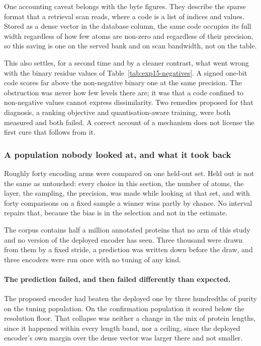 \begin{table}[htbp]
  \centering
  \caption{Maximum F-measure against the bits kept per stored value, with the bytes a
  code occupies in the sparse retrieval format. $^{*}$~the 95\,\% interval excludes
  zero.}
  \label{tab:exp15-quantisation}
  
\end{table}

One accounting caveat belongs with the byte figures. They describe the sparse format
that a retrieval scan reads, where a code is a list of indices and values. Stored as a
dense vector in the database column, the same code occupies its full width regardless
of how few atoms are non-zero and regardless of their precision, so this saving is one
on the served bank and on scan bandwidth, not on the table.

This also settles, for a second time and by a cleaner contrast, what went wrong with
the binary residue values of Table~\ref{tab:exp15-negatives}. A signed one-bit code
scores far above the non-negative binary one at the same precision. The obstruction
was never how few levels there are; it was that a code confined to non-negative
values cannot express dissimilarity. Two remedies proposed for that diagnosis, a
ranking objective and quantisation-aware training, were both measured and both failed.
A correct account of a mechanism does not license the first cure that follows from it.

\subsubsection{A population nobody looked at, and what it took back}
\label{sec:exp15-confirmation}

Roughly forty encoding arms were compared on one held-out set. Held out is not the
same as untouched: every choice in this section, the number of atoms, the layer, the
sampling, the precision, was made while looking at that set, and with forty
comparisons on a fixed sample a winner wins partly by chance. No interval repairs
that, because the bias is in the selection and not in the estimate.

The corpus contains half a million annotated proteins that no arm of this study and
no version of the deployed encoder has seen. Three thousand were drawn from them by a
fixed stride, a prediction was written down before the draw, and three encoders were
run once with no tuning of any kind.

\paragraph{The prediction failed, and then failed differently than expected.} The
proposed encoder had beaten the deployed one by three hundredths of purity on the
tuning population. On the confirmation population it scored below the resolution
floor. That collapse was neither a change in the mix of protein lengths, since it
happened within every length band, nor a ceiling, since the deployed encoder's own
margin over the dense vector was larger there and not smaller.


